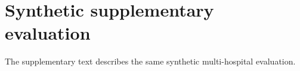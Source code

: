 \section{Synthetic supplementary evaluation}
The supplementary text describes the same synthetic multi-hospital evaluation.
